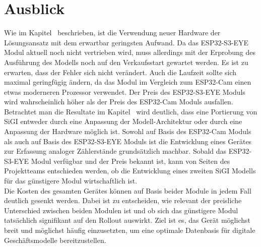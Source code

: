 \chapter{Ausblick}\label{ch:Ausblick}
    Wie im Kapitel~ beschrieben, ist die Verwendung neuer Hardware der Lösungsansatz mit dem erwartbar geringsten Aufwand. Da das ESP32-S3-EYE Modul aktuell noch nicht vertrieben wird, muss allerdings mit der Erprobung des Ausführung des Modells noch auf den Verkaufsstart gewartet werden. Es ist zu erwarten, dass der Fehler sich nicht verändert. Auch die Laufzeit sollte sich maximal geringfügig ändern, da das Modul im Vergleich zum ESP32-Cam einen etwas moderneren Prozessor verwendet. Der Preis des ESP32-S3-EYE Moduls wird wahrscheinlich höher als der Preis des ESP32-Cam Moduls ausfallen.\\ Betrachtet man die Resultate im Kapitel~ wird deutlich, dass eine Portierung von SiGI entweder durch eine Anpassung der Modell-Architektur oder durch eine Anpassung der Hardware möglich ist. Sowohl auf Basis des ESP32-Cam Moduls als auch auf Basis des ESP32-S3-EYE Moduls ist die Entwicklung eines Gerätes zur Erfassung analoger Zählerstände grundsätzlich machbar. Sobald das ESP32-S3-EYE Modul verfügbar und der Preis bekannt ist, kann von Seiten des Projektteams entschieden werden, ob die Entwicklung eines zweiten SiGI Modells für das günstigere Modul wirtschaftlich ist.\\ Die Kosten des gesamten Gerätes können auf Basis beider Module in jedem Fall deutlich gesenkt werden. Dabei ist zu entscheiden, wie relevant der preisliche Unterschied zwischen beiden Modulen ist und ob sich das günstigere Modul tatsächlich signifikant auf den Rollout auswirkt. Ziel ist es, das Gerät möglichst breit und möglichst häufig einzusetzten, um eine optimale Datenbasis für digitale Geschäftsmodelle bereitzustellen.